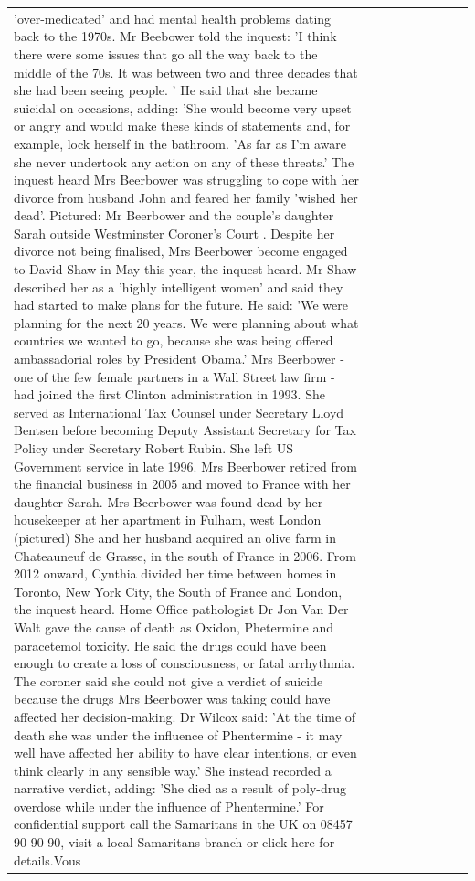 \begin{table}[H]
\begin{tabular}{lllrlllll}
'over-medicated' and had mental health problems dating back to the 1970s. Mr Beebower told the inquest: 'I think there were some issues that go all the way back to the middle of the 70s. It was between two and three decades that she had been seeing people. ' He said that she became suicidal on occasions, adding: 'She would become very upset or angry and would make these kinds of statements and, for example, lock herself in the bathroom. 'As far as I'm aware she never undertook any action on any of these threats.' The inquest heard Mrs Beerbower was struggling to cope with her divorce from husband John and feared her family 'wished her dead'. Pictured: Mr Beerbower and the couple's daughter Sarah outside Westminster Coroner's Court . Despite her divorce not being finalised, Mrs Beerbower become engaged to David Shaw in May this year, the inquest heard. Mr Shaw described her as a 'highly intelligent women' and said they had started to make plans for the future. He said: 'We were planning for the next 20 years. We were planning about what countries we wanted to go, because she was being offered ambassadorial roles by President Obama.' Mrs Beerbower - one of the few female partners in a Wall Street law firm - had joined the first Clinton administration in 1993. She served as International Tax Counsel under Secretary Lloyd Bentsen before becoming Deputy Assistant Secretary for Tax Policy under Secretary Robert Rubin. She left US Government service in late 1996. Mrs Beerbower retired from the financial business in 2005 and moved to France with her daughter Sarah. Mrs Beerbower was found dead by her housekeeper at her apartment in Fulham, west London (pictured) She and her husband acquired an olive farm in Chateauneuf de Grasse, in the south of France in 2006. From 2012 onward, Cynthia divided her time between homes in Toronto, New York City, the South of France and London, the inquest heard. Home Office pathologist Dr Jon Van Der Walt gave the cause of death as Oxidon, Phetermine and paracetemol toxicity. He said the drugs could have been enough to create a loss of consciousness, or fatal arrhythmia. The coroner said she could not give a verdict of suicide because the drugs Mrs Beerbower was taking could have affected her decision-making. Dr Wilcox said: 'At the time of death she was under the influence of Phentermine - it may well have affected her ability to have clear intentions, or even think clearly in any sensible way.' She instead recorded a narrative verdict, adding: 'She died as a result of poly-drug overdose while under the influence of Phentermine.' For confidential support call the Samaritans in the UK on 08457 90 90 90, visit a local Samaritans branch or click here for details.Vous \\

\end{tabular}
\end{table}
